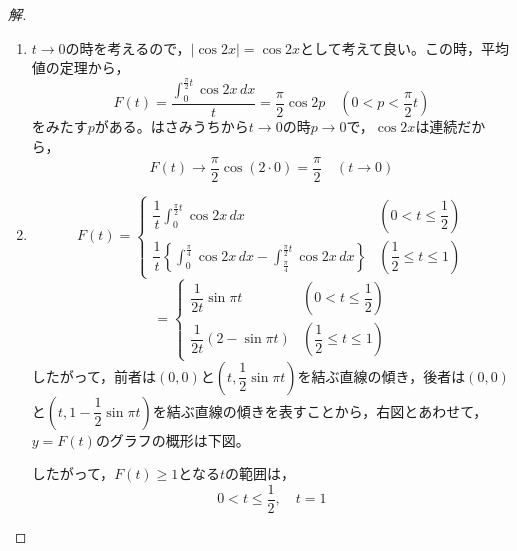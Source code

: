 \documentclass[../main.tex]{subfiles}
\begin{document}
\begin{proof}[解]
  \begin{enumerate}
    \item[(1)] $t\to0$の時を考えるので，$|\cos2x|=\cos2x$として考えて良い。この時，平均値の定理から，
      \[
        F(t)=\frac{\int_0^{\frac{\pi}{2}t}\cos2x\,dx}{t}=\frac{\pi}{2}\cos2p \quad \left(0<p<\frac{\pi}{2}t\right)
      \]
      をみたす$p$がある。はさみうちから$t\to0$の時$p\to0$で，$\cos2x$は連続だから，
      \[
        F(t)\longrightarrow\frac{\pi}{2}\cos(2\cdot0)=\frac{\pi}{2} \quad (t\to0)
      \]

    \item[(2)]
      \[
        F(t)=
        \begin{cases}
          \dfrac1t\displaystyle\int_0^{\frac{\pi}{2}t}\cos2x\,dx & \left(0<t\le\dfrac12\right) \\[2mm]
          \dfrac1t\left\{\displaystyle\int_0^{\frac{\pi}{4}}\cos2x\,dx-\int_{\frac{\pi}{4}}^{\frac{\pi}{2}t}\cos2x\,dx\right\} & \left(\dfrac12\le t\le1\right)
        \end{cases}
      \]
      \[
        =
        \begin{cases}
          \dfrac{1}{2t}\sin\pi t & \left(0<t\le\dfrac12\right) \\[2mm]
          \dfrac{1}{2t}(2-\sin\pi t) & \left(\dfrac12\le t\le1\right)
        \end{cases}
      \]
      したがって，前者は$(0,0)$と$\left(t,\dfrac12\sin\pi t\right)$を結ぶ直線の傾き，後者は$(0,0)$と$\left(t,1-\dfrac12\sin\pi t\right)$を結ぶ直線の傾きを表すことから，右図とあわせて，$y=F(t)$のグラフの概形は下図。

      \begin{center}
      \end{center}

      したがって，$F(t)\ge1$となる$t$の範囲は，
      \[
        0<t\le\frac12,\quad t=1
      \]
  \end{enumerate}
\end{proof}
\end{document}
